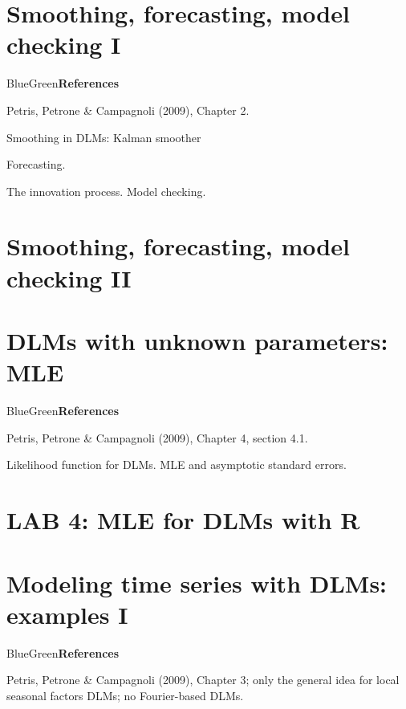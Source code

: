 \documentclass[dvipsnames,12pt]{book}
\begin{document}
    \chapter{Smoothing, forecasting, model checking I}

        \begin{mybox}{BlueGreen}{\textbf{References}}

            Petris, Petrone \& Campagnoli (2009), Chapter 2.
            
        \end{mybox}

        Smoothing in DLMs: Kalman smoother

        Forecasting.

        The innovation process. Model checking.

    \chapter{Smoothing, forecasting, model checking II}


    \chapter{DLMs with unknown parameters: MLE}

        \begin{mybox}{BlueGreen}{\textbf{References}}

            Petris, Petrone \& Campagnoli (2009), Chapter 4, section 4.1.
            
        \end{mybox}

        Likelihood function for DLMs. MLE and asymptotic standard errors.

    \chapter*{LAB 4: MLE for DLMs with R}


    \chapter{Modeling time series with DLMs: examples I}

        \begin{mybox}{BlueGreen}{\textbf{References}}

            Petris, Petrone \& Campagnoli (2009), Chapter 3; only the general idea for local seasonal factors DLMs; no Fourier-based DLMs.
            
        \end{mybox}
\end{document}

